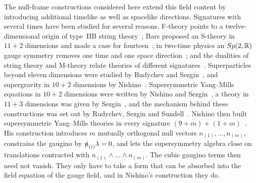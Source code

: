 The null-frame constructions considered here extend this field content by introducing additional timelike as well as spacelike directions. Signatures with several times have been studied for several reasons. F-theory points to a twelve-dimensional origin of type~IIB string theory~\cite{Vafa1996}; Bars proposed an S-theory in $11+2$ dimensions and made a case for fourteen~\cite{Bars1997,Bars1997b}; in two-time physics an $Sp(2,\mathbb{R})$ gauge symmetry removes one time and one space direction~\cite{BarsKounnas1997,BarsDelidumanAndreev1998,Bars2000}; and the dualities of string theory and M-theory relate theories of different signatures~\cite{Hull1998,Hull1998b}. Superparticles beyond eleven dimensions were studied by Rudychev and Sezgin~\cite{RudychevSezgin1997}, and supergravity in $10+2$ dimensions by Nishino~\cite{Nishino1998b}. Supersymmetric Yang--Mills equations in $10+2$ dimensions were written by Nishino and Sezgin~\cite{NishinoSezgin1996}, a theory in $11+3$ dimensions was given by Sezgin~\cite{Sezgin1997}, and the mechanism behind these constructions was set out by Rudychev, Sezgin and Sundell~\cite{RudychevSezginSundell1998}. Nishino then built supersymmetric Yang--Mills theories in every signature $(9+m)+(1+m)$~\cite{Nishino1998}. His construction introduces $m$ mutually orthogonal null vectors $n_{(1)},\dots,n_{(m)}$, constrains the gaugino by $\slashed{n}_{(i)}\lambda=0$, and lets the supersymmetry algebra close on translations contracted with $n_{(1)}\wedge\dots\wedge n_{(m)}$. The cubic gaugino terms then need not vanish. They only have to take a form that can be absorbed into the field equation of the gauge field, and in Nishino's construction they do.

